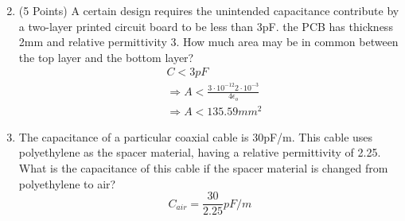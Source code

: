 \documentclass{article}
\begin{document}
\begin{enumerate}
\begin{equation}
    \end{equation}
    \newpage
    \item (5 Points) A certain design requires the unintended capacitance contribute by a two-layer printed circuit board to be less than 3pF. the PCB has thickness 2mm and relative permittivity 3. How much area may be in common between the top layer and the bottom layer?
    \begin{align}
        &C < 3pF\\
        &\Rightarrow A < \frac{3\cdot10^{-12}2\cdot10^{-3}}{4\epsilon_o}\\
        &\Rightarrow \boxed{A < 135.59 mm^2}
    \end{align}
    \newpage
    \item  The capacitance of a particular coaxial cable is 30pF/m. This cable uses polyethylene as the spacer material, having a relative permittivity of 2.25. What is the capacitance of this cable if the spacer material is changed from polyethylene to air?
    \begin{equation}
        \boxed{C_{air} = \frac{30}{2.25}pF/m}
    \end{equation}
\end{enumerate}
\end{document}
